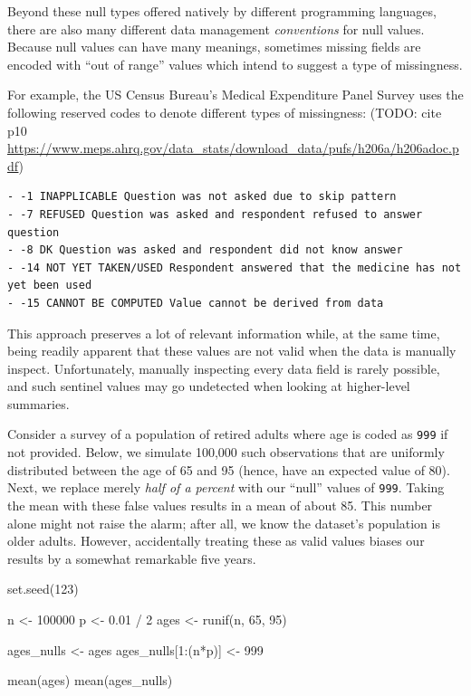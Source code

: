 \documentclass[
]{krantz}
\makeatletter
\newenvironment{Shaded}{\begin{snugshade}}{\end{snugshade}}
\newcommand{\DecValTok}[1]{\textcolor[rgb]{0.06,0.06,0.06}{#1}}
\newcommand{\FloatTok}[1]{\textcolor[rgb]{0.06,0.06,0.06}{#1}}
\newcommand{\FunctionTok}[1]{\textcolor[rgb]{0,0,0}{#1}}
\newcommand{\NormalTok}[1]{#1}
\newcommand{\OtherTok}[1]{\textcolor[rgb]{0.37,0.37,0.37}{#1}}
\newcommand{\SpecialCharTok}[1]{\textcolor[rgb]{0,0,0}{#1}}
\newenvironment{kframe}{%
\medskip{}
\setlength{\fboxsep}{.8em}
 \def\at@end@of@kframe{}%
 \ifinner\ifhmode%
  \def\at@end@of@kframe{\end{minipage}}%
  \begin{minipage}{\columnwidth}%
 \fi\fi%
 \def\FrameCommand##1{\hskip\@totalleftmargin \hskip-\fboxsep
 \colorbox{shadecolor}{##1}\hskip-\fboxsep
     \hskip-\linewidth \hskip-\@totalleftmargin \hskip\columnwidth}%
 \MakeFramed {\advance\hsize-\width
   \@totalleftmargin\z@ \linewidth\hsize
   \@setminipage}}%
 {\par\unskip\endMakeFramed%
 \at@end@of@kframe}
\renewenvironment{Shaded}{\begin{kframe}}{\end{kframe}}
\makeatother
\begin{document}
Beyond these null types offered natively by different programming languages, there are also many different data management \emph{conventions} for null values. Because null values can have many meanings, sometimes missing fields are encoded with ``out of range'' values which intend to suggest a type of missingness.

For example, the US Census Bureau's Medical Expenditure Panel Survey uses the following reserved codes to denote different types of missingness: (TODO: cite p10 \url{https://www.meps.ahrq.gov/data_stats/download_data/pufs/h206a/h206adoc.pdf})

\begin{verbatim}
- -1 INAPPLICABLE Question was not asked due to skip pattern
- -7 REFUSED Question was asked and respondent refused to answer question
- -8 DK Question was asked and respondent did not know answer
- -14 NOT YET TAKEN/USED Respondent answered that the medicine has not yet been used
- -15 CANNOT BE COMPUTED Value cannot be derived from data
\end{verbatim}

This approach preserves a lot of relevant information while, at the same time, being readily apparent that these values are not valid when the data is manually inspect. Unfortunately, manually inspecting every data field is rarely possible, and such sentinel values may go undetected when looking at higher-level summaries.

Consider a survey of a population of retired adults where age is coded as \texttt{999} if not provided. Below, we simulate 100,000 such observations that are uniformly distributed between the age of 65 and 95 (hence, have an expected value of 80). Next, we replace merely \emph{half of a percent} with our ``null'' values of \texttt{999}. Taking the mean with these false values results in a mean of about 85. This number alone might not raise the alarm; after all, we know the dataset's population is older adults. However, accidentally treating these as valid values biases our results by a somewhat remarkable five years.

\begin{Shaded}
\begin{Highlighting}[]
\FunctionTok{set.seed}\NormalTok{(}\DecValTok{123}\NormalTok{)}

\NormalTok{n }\OtherTok{\textless{}{-}} \DecValTok{100000}
\NormalTok{p }\OtherTok{\textless{}{-}} \FloatTok{0.01} \SpecialCharTok{/} \DecValTok{2}
\NormalTok{ages }\OtherTok{\textless{}{-}} \FunctionTok{runif}\NormalTok{(n, }\DecValTok{65}\NormalTok{, }\DecValTok{95}\NormalTok{)}

\NormalTok{ages\_nulls }\OtherTok{\textless{}{-}}\NormalTok{ ages}
\NormalTok{ages\_nulls[}\DecValTok{1}\SpecialCharTok{:}\NormalTok{(n}\SpecialCharTok{*}\NormalTok{p)] }\OtherTok{\textless{}{-}} \DecValTok{999}

\FunctionTok{mean}\NormalTok{(ages)}
\FunctionTok{mean}\NormalTok{(ages\_nulls)}
\end{Highlighting}
\end{Shaded}
\end{document}
